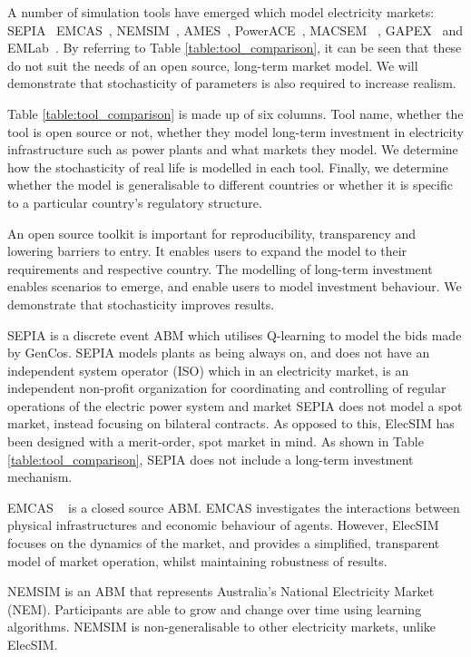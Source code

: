A number of simulation tools have emerged which model electricity markets: SEPIA~\cite{Harp2000} EMCAS~\cite{Conzelmann}, NEMSIM~\cite{Batten2006}, AMES~\cite{Sun2007}, PowerACE~\cite{Rothengatter2007}, MACSEM ~\cite{Praca2003}, GAPEX~\cite{Cincotti2013} and  EMLab~\cite{Chappin2017}. By referring to Table \ref{table:tool_comparison}, it can be seen that these do not suit the needs of an open source, long-term market model. We will demonstrate that stochasticity of parameters is also required to increase realism.

Table \ref{table:tool_comparison} is made up of six columns. Tool name, whether the tool is open source or not, whether they model long-term investment in electricity infrastructure such as power plants and what markets they model. We determine how the stochasticity of real life is modelled in each tool. Finally, we determine whether the model is generalisable to different countries or whether it is specific to a particular country's regulatory structure. 


An open source toolkit is important for reproducibility, transparency and lowering barriers to entry. It enables users to expand the model to their requirements and respective country. The modelling of long-term investment enables scenarios to emerge, and enable users to model investment behaviour. We demonstrate that stochasticity improves results.

SEPIA \cite{Harp2000} is a discrete event ABM which utilises Q-learning to model the bids made by GenCos. SEPIA models plants as being always on, and does not have an independent system operator (ISO) which in an electricity market, is an independent non-profit organization for coordinating and controlling of regular operations of the electric power system and market \cite{Zhou2007} SEPIA does not model a spot market, instead focusing on bilateral contracts. As opposed to this, ElecSIM has been designed with a merit-order, spot market in mind. As shown in Table \ref{table:tool_comparison}, SEPIA does not include a long-term investment mechanism. 

EMCAS ~\cite{Conzelmann} is a closed source ABM. EMCAS investigates the interactions between physical infrastructures and economic behaviour of agents. However, ElecSIM focuses on the dynamics of the market, and provides a simplified, transparent model of market operation, whilst maintaining robustness of results.

NEMSIM \cite{Grozev2005} is an ABM that represents Australia's National Electricity Market (NEM). Participants are able to grow and change over time using learning algorithms. NEMSIM is non-generalisable to other electricity markets, unlike ElecSIM.

